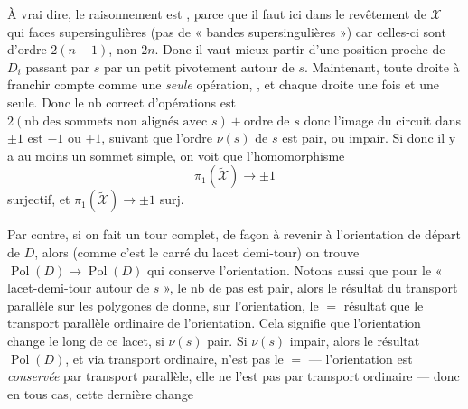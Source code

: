 \documentclass[11pt,a4paper]{article}
\begin{document}
 À vrai dire, le raisonnement est , parce que il faut  ici dans le revêtement de $\mathcal{X}$ qui  faces supersingulières (pas de « bandes supersingulières ») car celles-ci sont d'ordre $2(n-1)$, non $2n$. Donc il vaut mieux partir d'une position proche de $D_i$ passant par $s$ par un petit pivotement autour de $s$. Maintenant, toute droite à franchir compte comme une \emph{seule} opération, , et chaque droite    une fois et une seule. Donc le nb correct d'opérations est
$2(\text{nb des sommets non alignés avec } s) + \text{ordre de } s$
donc l'image du circuit dans $\pm 1$ est $-1$ ou $+1$, suivant que l'ordre $\nu(s)$ de $s$ est pair, ou impair. Si donc il y a au moins un sommet simple, on voit que l'homomorphisme
\[
\pi_1(\widetilde{\mathcal{X}}) \longrightarrow \pm 1
\]
surjectif, et  $\pi_1(\widetilde{\mathcal{X}}) \to \pm 1$ surj.

Par contre, si on fait un tour complet, de façon à revenir à l'orientation de départ de $D$, alors (comme c'est le carré du lacet demi-tour) on trouve \struck{\ill{} \ill{} \ill{}}  $\operatorname{Pol}(D) \to \operatorname{Pol}(D)$ qui conserve l'orientation. Notons aussi que  pour le « lacet-demi-tour autour de $s$ », \struck{\ill{}} le nb de pas est pair, alors le résultat du transport parallèle sur les polygones de  donne, sur l'orientation, le $=$ résultat que le transport parallèle ordinaire de l'orientation. Cela signifie que l'orientation change  le long de ce lacet, si $\nu(s)$ pair. Si $\nu(s)$ impair, alors le résultat  $\operatorname{Pol}(D)$, et via transport ordinaire, n'est \struck{\ill{}} pas le $=$ ---   l'orientation est \emph{conservée} par transport parallèle, elle ne l'est pas par transport ordinaire --- donc en tous cas, cette dernière change
\end{document}
